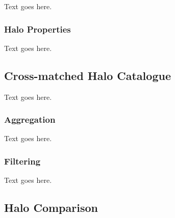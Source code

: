 Text goes here.



\subsubsection{Halo Properties}
\label{subsubsec:analysis--density_profile--halo_properties}


Text goes here.




\subsection{Cross-matched Halo Catalogue}
\label{subsec:analysis--catalogue}


Text goes here.



\subsubsection{Aggregation}
\label{subsubsec:analysis--catalogue--aggregation}


Text goes here.



\subsubsection{Filtering}
\label{subsubsec:analysis--catalogue--filtering}


Text goes here.




\subsection{Halo Comparison}
\label{subsec:analysis--halo_comparison}


